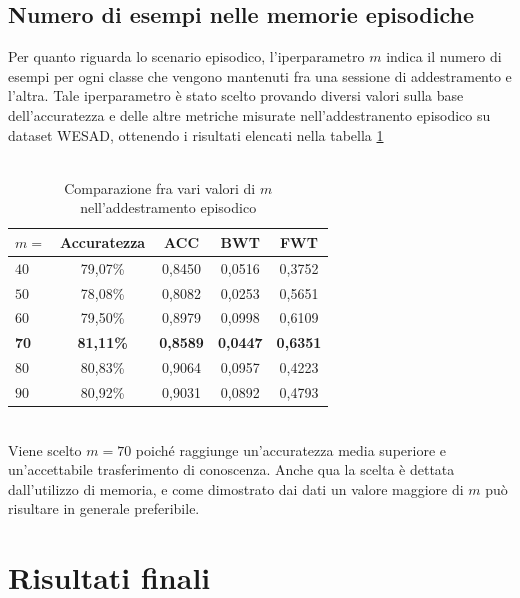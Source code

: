 \subsection{Numero di esempi nelle memorie episodiche}
Per quanto riguarda lo scenario episodico, l'iperparametro $m$ indica il numero di esempi per ogni classe che vengono mantenuti fra una sessione di addestramento e l'altra. Tale iperparametro è stato scelto provando diversi valori sulla base dell'accuratezza e delle altre metriche misurate nell'addestranento episodico su dataset WESAD, ottenendo i risultati elencati nella tabella \ref{tab:episodicmtest}\\\\
\begin{table}[h]
    \begin{center}
        \begin{tabular}{l|c|c|c|c}
            \textbf{$m =$} & \textbf{Accuratezza} & \textbf{ACC} & \textbf{BWT} & \textbf{FWT}\\
            \hline
            $40$ & 79,07\% & 0,8450 & 0,0516 & 0,3752\\
            $50$ & 78,08\% & 0,8082 & 0,0253 & 0,5651\\
            $60$ & 79,50\% & 0,8979 & 0,0998 & 0,6109\\
            \textbf{70} & \textbf{81,11\%} & \textbf{0,8589} & \textbf{0,0447} & \textbf{0,6351}\\
            $80$ & 80,83\% & 0,9064 & 0,0957 & 0,4223\\
            $90$ & 80,92\% & 0,9031 & 0,0892 & 0,4793
        \end{tabular}
        \caption{Comparazione fra vari valori di $m$ nell'addestramento episodico}
        \label{tab:episodicmtest}
    \end{center}
\end{table}\\
Viene scelto $m = 70$ poiché raggiunge un'accuratezza media superiore e un'accettabile trasferimento di conoscenza. Anche qua la scelta è dettata dall'utilizzo di memoria, e come dimostrato dai dati un valore maggiore di $m$ può risultare in generale preferibile.

\pagebreak
\section{Risultati finali}
